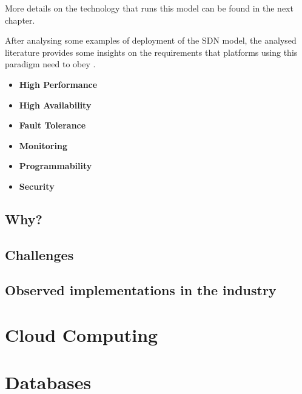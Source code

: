 \par More details on the technology that runs this model can be found in the next chapter. 
\par After analysing some examples of deployment of the SDN model, the analysed literature provides some insights on the requirements that platforms using this paradigm need to obey \cite {masutani_requirements_2014}.
 
\begin {itemize} 
    \item \textbf{High Performance}   
    \item \textbf{High Availability} 
    \item \textbf{Fault Tolerance}   
    \item \textbf{Monitoring}   
    \item \textbf{Programmability}   
    \item \textbf{Security}   
\end {itemize}



\subsection {Why?}
\subsection {Challenges}
\subsection {Observed implementations in the industry}

\section {Cloud Computing}
\section {Databases} 

